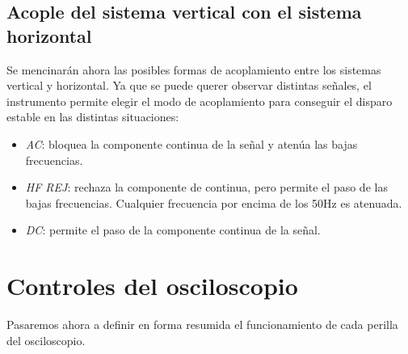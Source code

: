 \documentclass{article}
\begin{document}
\subsection{Acople del sistema vertical con el sistema horizontal}

	Se mencinarán ahora las posibles formas de acoplamiento entre los sistemas vertical y horizontal. Ya que se puede querer observar distintas señales, el instrumento permite elegir el modo de acoplamiento para conseguir el disparo estable en las distintas situaciones:
\medskip

\begin{itemize}
	\item \textit{AC}: bloquea la componente continua de la señal y atenúa las bajas frecuencias.
	\item \textit{HF REJ}: rechaza la componente de continua, pero permite el paso de las bajas frecuencias. Cualquier frecuencia por encima de los 50Hz es atenuada.
	\item \textit{DC}: permite el paso de la componente continua de la señal.

\end{itemize}
\bigskip\bigskip




\section{Controles del osciloscopio}

	Pasaremos ahora a definir en forma resumida el funcionamiento de cada perilla del osciloscopio. 
\bigskip
\end{document}
